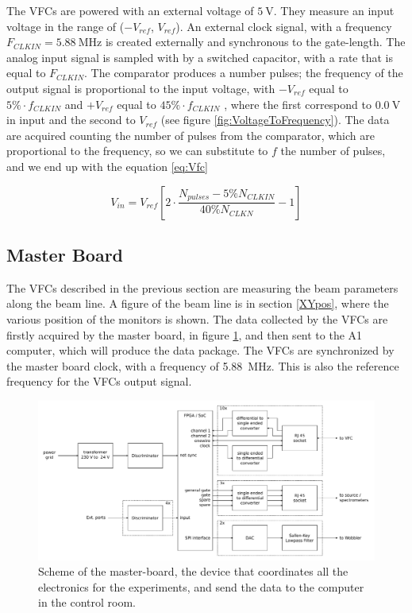 The VFCs are powered with an external voltage of $\SI{5}{\volt}$. They measure an input voltage in the range of ($-V_{ref}$, $V_{ref}$). An external clock signal, with a frequency $F_{CLKIN} = \SI{5.88}{\mega \hertz}$ is created externally and synchronous to the gate-length.
The analog input signal is sampled with by a switched capacitor, with a rate that is equal to $F_{CLKIN}$.
The comparator produces a number pulses; the frequency of the output signal is proportional to the input voltage, with $-V_{ref}$ equal to $5 \% \cdot f_{CLKIN}$ and $+V_{ref}$ equal to $45 \% \cdot f_{CLKIN}$ \cite{VfcDatasheet}, where the first correspond to $\SI{0.0}{ \volt}$ in input and the second to $V_{ref}$ (see figure \ref{fig:VoltageToFrequency}). The data are acquired counting the number of pulses from the comparator, which are proportional to the frequency, so we can substitute to $f$ the number of pulses, and we end up with the equation \ref{eq:Vfc}

\begin{equation} \label{eq:Vfc}
V_{in} =  V_{ref}[2 \cdot \dfrac{N_{pulses} - 5 \% N_{CLKIN}}{40 \% N_{CLKN}} - 1]
\end{equation}

\subsection{Master Board}

The VFCs described in the previous section are measuring the beam parameters along the beam line. A figure of the beam line is in section \ref{XYpos}, where the various position of the monitors is shown.
The data collected by the VFCs are firstly acquired by the master board, in figure \ref{fig:MasterBoard}, and then sent to the A1 computer, which will produce the data package. The VFCs are synchronized by the master board clock, with a frequency of \SI{5.88}{\mega \hertz}. This is also the reference frequency for the VFCs output signal. 

\begin{figure}[hbtp]
\centering
\includegraphics[width = \textwidth]{ExperimentalSetup/masterboard.pdf}
\caption{Scheme of the master-board, the device that coordinates all the electronics for the experiments, and send the data to the computer in the control room.}
\label{fig:MasterBoard}
\end{figure}

